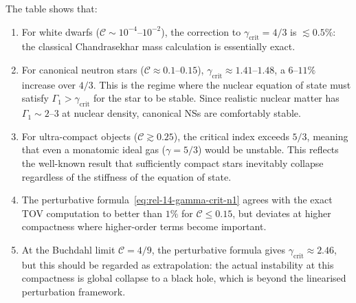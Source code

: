 \noindent
The table shows that:
\begin{enumerate}
\item For white dwarfs ($\mathscr{C} \sim 10^{-4}$--$10^{-2}$),
  the correction to $\gamma_{\mathrm{crit}} = 4/3$ is $\lesssim 0.5\%$:
  the classical Chandrasekhar mass calculation is essentially exact.

\item For canonical neutron stars ($\mathscr{C} \approx 0.1$--$0.15$),
  $\gamma_{\mathrm{crit}} \approx 1.41$--$1.48$, a $6$--$11\%$
  increase over $4/3$.  This is the regime where the nuclear equation
  of state must satisfy $\Gamma_{1} > \gamma_{\mathrm{crit}}$ for the
  star to be stable.  Since realistic nuclear matter has
  $\Gamma_{1} \sim 2$--$3$ at nuclear density, canonical NSs are
  comfortably stable.

\item For ultra-compact objects ($\mathscr{C} \gtrsim 0.25$), the
  critical index exceeds $5/3$, meaning that even a monatomic ideal
  gas ($\gamma = 5/3$) would be unstable.  This reflects the
  well-known result that sufficiently compact stars inevitably
  collapse regardless of the stiffness of the equation of state.

\item The perturbative formula~\eqref{eq:rel-14-gamma-crit-n1} agrees
  with the exact TOV computation to better than $1\%$ for
  $\mathscr{C} \leq 0.15$, but deviates at higher compactness
  where higher-order terms become important.

\item At the Buchdahl limit $\mathscr{C} = 4/9$, the perturbative
  formula gives $\gamma_{\mathrm{crit}} \approx 2.46$, but this
  should be regarded as extrapolation: the actual instability at
  this compactness is global collapse to a black hole, which is
  beyond the linearised perturbation framework.
\end{enumerate}

